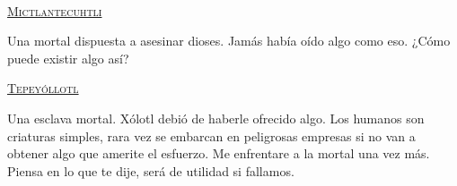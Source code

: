 \begin{center}
\\
\par
\textsc{\underline{Mictlantecuhtli}}
\\
\par
Una mortal dispuesta a asesinar dioses. Jamás había oído algo como eso. ¿Cómo puede existir algo así?
\\
\par
 \textsc{\underline{Tepeyóllotl}}
\\
\par
Una esclava mortal. Xólotl debió de haberle ofrecido algo. Los humanos son criaturas simples, rara vez se embarcan en peligrosas empresas si no van a obtener algo que amerite el esfuerzo. Me enfrentare a la mortal una vez más. Piensa en lo que te dije, será de utilidad si fallamos.
\end{center}